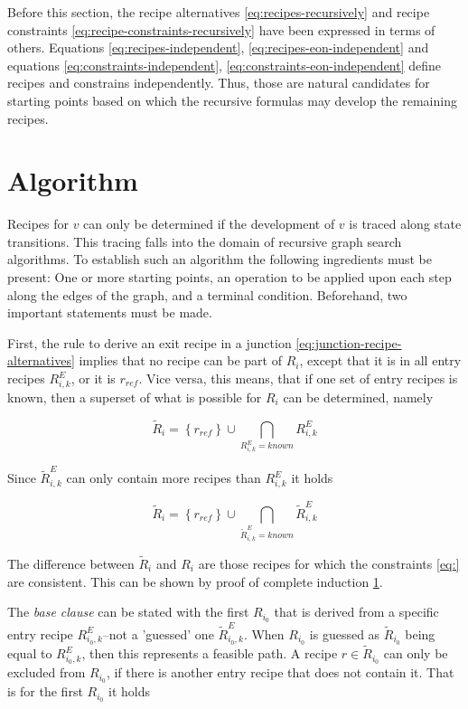 \documentclass[12pt,a4paper]{scrartcl}
\begin{document}
Before this section, the recipe alternatives \eqref{eq:recipes-recursively} and
recipe constraints \eqref{eq:recipe-constraints-recursively} have been
expressed in terms of others. Equations \eqref{eq:recipes-independent},
\eqref{eq:recipes-eon-independent}  and equations
\eqref{eq:constraints-independent}, \eqref{eq:constraints-eon-independent}
define recipes and constrains independently.  Thus, those are natural
candidates for starting points based on which the recursive formulas may
develop the remaining recipes. 

\section{Algorithm} %

Recipes for $v$ can only be determined if the development of $v$ is traced
along state transitions. This tracing falls into the domain of recursive graph
search algorithms. To establish such an algorithm the following ingredients 
must be present: One or more starting points, an operation to be applied upon 
each step along the edges of the graph, and a terminal condition. Beforehand,
two important statements must be made.

First, the rule to derive an exit recipe in a junction
\eqref{eq:junction-recipe-alternatives} implies that no recipe can be
part of $R_i$, except that it is in all entry recipes $R^E_{i,k}$, or it 
is $r_{ref}$. Vice versa, this means, that if one set of entry recipes is known,
then a superset of what is possible for $R_i$ can be determined, namely

\begin{equation}
    \tilde{R}_i = \left \{ r_{ref} \right \} \cup \bigcap_{R^E_{i,k}=known} R^E_{i,k}
\end{equation}

Since $\tilde{R}^E_{i,k}$ can only contain more recipes than $R^E_{i,k}$ it holds

\begin{equation}
    \tilde{R}_i = \left \{ r_{ref} \right \} \cup \bigcap_{\tilde{R}^E_{i,k}=known} \tilde{R}^E_{i,k}
\end{equation}

The difference between $\tilde{R}_i$ and $R_i$ are those recipes for which the
constraints \eqref{eq:} are consistent. This can be shown by proof of complete
induction \ref{}. 

The \textit{base clause} can be stated with the first $R_i_0$
that is derived from a specific entry recipe $R^E_{i_0,k}$--not a 'guessed' one
$\tilde{R}^E_{i_0,k}$. When $R_i_0$ is guessed as $\tilde{R}_i_0$ being equal
to $R^E_{i_0,k}$, then this represents a feasible path. A recipe $r\in
\tilde{R}_i_0$ can only be excluded from $R_i_0$, if there is another entry
recipe that does not contain it. That is for the first $R_i_0$ it holds
\end{document}
